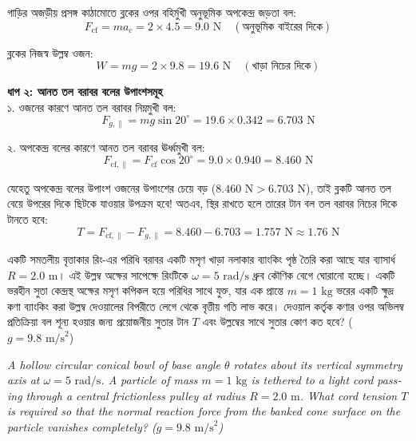 \documentclass[12pt, a4paper]{article}
\begin{document}
{{\begin{tcolorbox}[solutionbox={সমাধান (Solution)}]
    গাড়ির অজড়ীয় প্রসঙ্গ কাঠামোতে ব্লকের ওপর বহির্মুখী অনুভূমিক অপকেন্দ্র জড়তা বল:
    \[ F_{\text{cf}} = m a_c = 2 \times 4.5 = 9.0\text{ N} \quad (\text{অনুভূমিক বাইরের দিকে}) \]
    
    ব্লকের নিজস্ব উল্লম্ব ওজন:
    \[ W = m g = 2 \times 9.8 = 19.6\text{ N} \quad (\text{খাড়া নিচের দিকে}) \]
    
    \vspace{0.5em}
    \noindent\textbf{ধাপ ২: আনত তল বরাবর বলের উপাংশসমূহ} \\
    ১. ওজনের কারণে আনত তল বরাবর নিম্নমুখী বল:
    \[ F_{g, \parallel} = m g \sin 20^\circ = 19.6 \times 0.342 = 6.703\text{ N} \]
    
    ২. অপকেন্দ্র বলের কারণে আনত তল বরাবর ঊর্ধ্বমুখী বল:
    \[ F_{\text{cf}, \parallel} = F_{\text{cf}} \cos 20^\circ = 9.0 \times 0.940 = 8.460\text{ N} \]
    
    যেহেতু অপকেন্দ্র বলের উপাংশ ওজনের উপাংশের চেয়ে বড় ($8.460\text{ N} > 6.703\text{ N}$), তাই ব্লকটি আনত তল বেয়ে উপরের দিকে ছিটকে যাওয়ার উপক্রম হবে! অতএব, স্থির রাখতে হলে তারের টান বল তল বরাবর নিচের দিকে টানতে হবে:
    \[ T = F_{\text{cf}, \parallel} - F_{g, \parallel} = 8.460 - 6.703 = 1.757\text{ N} \approx \mathbf{1.76}\text{ N} \]
\end{tcolorbox}

\newpage

\begin{tcolorbox}[questionbox={প্রশ্ন (Question) 22}]
    \noindent
    একটি সমতলীয় বৃত্তাকার রিং-এর পরিধি বরাবর একটি মসৃণ খাড়া নলাকার ব্যাংকিং পৃষ্ঠ তৈরি করা আছে যার ব্যাসার্ধ $R = 2.0\text{ m}$। এই উল্লম্ব অক্ষের সাপেক্ষে রিংটিকে $\omega = 5\text{ rad/s}$ ধ্রুব কৌণিক বেগে ঘোরানো হচ্ছে। একটি ভরহীন সুতা কেন্দ্রস্থ অক্ষের মসৃণ কপিকল হয়ে পরিধির সাথে যুক্ত, যার এক প্রান্তে $m = 1\text{ kg}$ ভরের একটি ক্ষুদ্র কণা ব্যাংকিং করা উল্লম্ব দেওয়ালের বিপরীতে লেগে থেকে বৃত্তীয় গতি লাভ করে। দেওয়াল কর্তৃক কণার ওপর অভিলম্ব প্রতিক্রিয়া বল শূন্য হওয়ার জন্য প্রয়োজনীয় সুতার টান $T$ এবং উল্লম্বের সাথে সুতার কোণ কত হবে? ($g = 9.8\text{ m/s}^2$)
    
    \vspace{0.8em}
    \begin{english}
    \noindent\textit{\color{darkgray}
    A hollow circular conical bowl of base angle $\theta$ rotates about its vertical symmetry axis at $\omega = 5\text{ rad/s}$. A particle of mass $m = 1\text{ kg}$ is tethered to a light cord passing through a central frictionless pulley at radius $R = 2.0\text{ m}$. What cord tension $T$ is required so that the normal reaction force from the banked cone surface on the particle vanishes completely? ($g = 9.8\text{ m/s}^2$)
    }
    \end{english}
\end{tcolorbox}

}}
\end{document}
